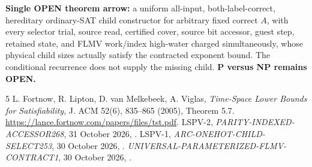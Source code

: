 \documentclass[11pt]{article}
\begin{document}
\noindent\textbf{Single OPEN theorem arrow:} a uniform all-input, both-label-correct, hereditary ordinary-SAT child constructor for arbitrary fixed correct $A$, with every selector trial, source read, certified cover, source bit accessor, guest step, retained state, and FLMV work/index high-water charged simultaneously, whose physical child sizes actually satisfy the contracted exponent bound. The conditional recurrence does not supply the missing child. \textbf{P versus NP remains OPEN.}

\begin{thebibliography}{5}
 L. Fortnow, R. Lipton, D. van Melkebeek, A. Viglas, \emph{Time-Space Lower Bounds for Satisfiability}, J. ACM 52(6), 835--865 (2005), Theorem 5.7. \url{https://lance.fortnow.com/papers/files/tst.pdf}.
 LSPV-2, \emph{PARITY-INDEXED-ACCESSOR268}, 31 October 2026, .
 LSPV-1, \emph{ARC-ONEHOT-CHILD-SELECT253}, 30 October 2026, .
 \emph{UNIVERSAL-PARAMETERIZED-FLMV-CONTRACT1}, 30 October 2026, .
\end{thebibliography}
\end{document}
